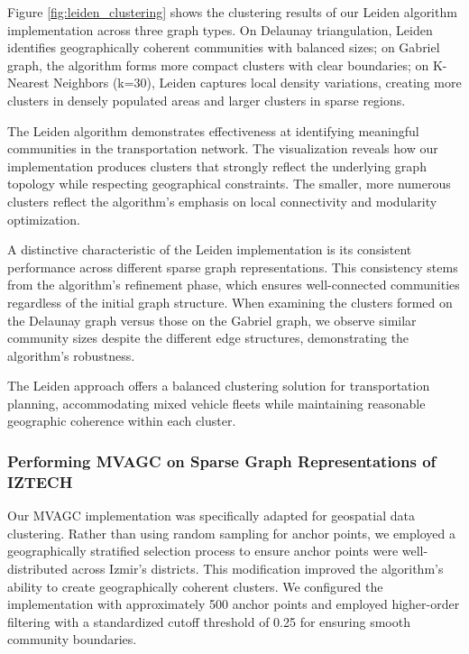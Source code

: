 Figure \ref{fig:leiden_clustering} shows the clustering results of our Leiden algorithm implementation across three graph types. On Delaunay triangulation, Leiden identifies geographically coherent communities with balanced sizes; on Gabriel graph, the algorithm forms more compact clusters with clear boundaries; on K-Nearest Neighbors (k=30), Leiden captures local density variations, creating more clusters in densely populated areas and larger clusters in sparse regions.

The Leiden algorithm demonstrates effectiveness at identifying meaningful communities in the transportation network. The visualization reveals how our implementation produces clusters that strongly reflect the underlying graph topology while respecting geographical constraints. The smaller, more numerous clusters reflect the algorithm's emphasis on local connectivity and modularity optimization.

A distinctive characteristic of the Leiden implementation is its consistent performance across different sparse graph representations. This consistency stems from the algorithm's refinement phase, which ensures well-connected communities regardless of the initial graph structure. When examining the clusters formed on the Delaunay graph versus those on the Gabriel graph, we observe similar community sizes despite the different edge structures, demonstrating the algorithm's robustness.

The Leiden approach offers a balanced clustering solution for transportation planning, accommodating mixed vehicle fleets while maintaining reasonable geographic coherence within each cluster.

\subsubsection{Performing MVAGC on Sparse Graph Representations of IZTECH}
\label{subsubsec:mvagc_implementation}

Our MVAGC implementation was specifically adapted for geospatial data clustering. Rather than using random sampling for anchor points, we employed a geographically stratified selection process to ensure anchor points were well-distributed across Izmir's districts. This modification improved the algorithm's ability to create geographically coherent clusters. We configured the implementation with approximately 500 anchor points and employed higher-order filtering with a standardized cutoff threshold of 0.25 for ensuring smooth community boundaries.

